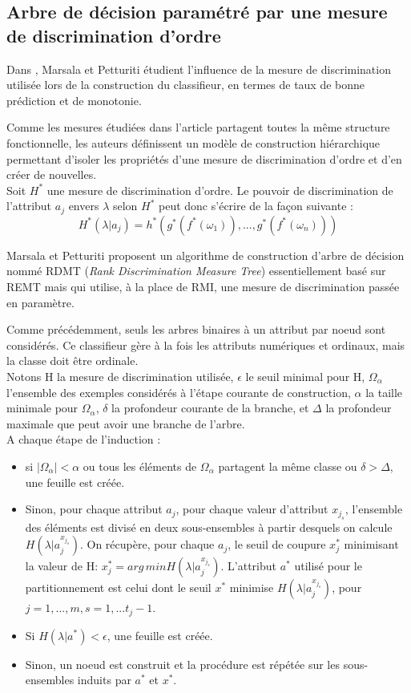 \documentclass[a4paper]{article}
\begin{document}
\subsection{Arbre de décision paramétré par une mesure de discrimination
d'ordre} 
Dans \cite{marsala-rank}, Marsala et Petturiti étudient l'influence de
la mesure de discrimination utilisée lors de la construction du classifieur, en
termes de taux de bonne prédiction et de monotonie. 

Comme les mesures étudiées dans l'article partagent toutes la même structure
fonctionnelle, les auteurs définissent un modèle de construction hiérarchique
permettant d'isoler les propriétés d'une mesure de discrimination d'ordre et
d'en créer de nouvelles. \\
Soit $H^*$ une mesure de discrimination d'ordre. Le pouvoir de discrimination de
l'attribut $a_j$ envers $\lambda$ selon $H^*$ peut donc s'écrire de la façon suivante :
$$ H^*(\lambda | a_j) = h^*(g^*(f^*(\omega_1)),...,g^*(f^*(\omega_n)))$$

Marsala et Petturiti proposent un algorithme de construction d'arbre de décision
nommé RDMT (\textit{Rank Discrimination Measure Tree}) essentiellement basé sur
REMT mais qui utilise, à la place de RMI, une mesure de discrimination passée en paramètre.

\noindent Comme précédemment, seuls les arbres binaires à un attribut par noeud
sont considérés. Ce classifieur gère à la fois les attributs numériques et ordinaux, mais la classe
doit être ordinale. \\

Notons H la mesure de discrimination utilisée, $\epsilon$ le seuil minimal pour
H, $\Omega_{\alpha}$ l'ensemble des exemples considérés à l'étape courante de
construction, $\alpha$ la taille minimale pour $\Omega_{\alpha}$, $\delta$ la
profondeur courante de la branche, et $\Delta$ la profondeur maximale que peut
avoir une branche de l'arbre. \\

\noindent A chaque étape de l'induction :
\begin{itemize}
    \item si $|\Omega_{\alpha}| < \alpha$ ou tous les éléments
de $\Omega_{\alpha}$ partagent la même classe ou $\delta > \Delta$, une feuille est créée. 
    \item Sinon, pour chaque attribut $a_j$, pour chaque valeur d'attribut $x_{j_s}$, l'ensemble
des éléments est divisé en deux sous-ensembles à partir desquels on calcule
        $H(\lambda|a^{x_{j_s}}_j)$. On récupère, pour chaque $a_j$,
le seuil de coupure $x^*_j$ minimisant la valeur de H:
$x^*_{j} = arg\,min H(\lambda|a^{x_{j_s}}_j)$. L'attribut $a^*$ utilisé pour le
partitionnement est celui dont le seuil $x^*$ minimise
$H(\lambda|a^{x_{j_s}}_j)$, pour $j=1,...,m, s=1,...t_j-1.$ 
    \item Si $H(\lambda|a^*) < \epsilon$, une feuille est créée. 
    \item Sinon, un noeud est construit et la
procédure est répétée sur les sous-ensembles induits par $a^*$ et $x^*$. \\
\end{itemize}
\end{document}
